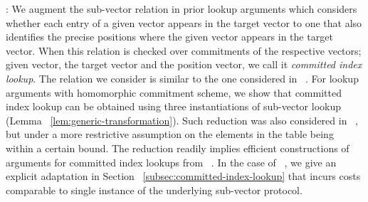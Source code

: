\documentclass[sigconf]{acmart}
\begin{document}
: We augment the sub-vector relation in prior lookup arguments which
considers whether each entry of a given vector appears in the target vector to one that also identifies
the precise positions where the given vector appears in the target vector. When this relation is checked
over commitments of the respective vectors; given vector, the target vector and the position vector, we call
it {\em committed index lookup}. The relation we consider is similar to the one considered in ~\cite{lasso}.
For lookup arguments with homomorphic commitment scheme, we show that committed index lookup can be obtained
using three instantiations of sub-vector lookup (Lemma ~\ref{lem:generic-transformation}). Such reduction was
also considered in ~\cite{lasso}, but under a more restrictive assumption on the elements in the table being
within a certain bound. The reduction readily implies
efficient constructions of arguments for committed index lookups from
~\cite{CCS:ZBKMNS22,EPRINT:PosKat22,EPRINT:ZGKMR22,EPRINT:EagFioGab22}.
In the case of ~\cite{EPRINT:PosKat22}, we give an explicit adaptation in
Section ~\ref{subsec:committed-index-lookup} that incurs costs comparable to single instance of the underlying sub-vector
protocol.\smallskip
\end{document}
